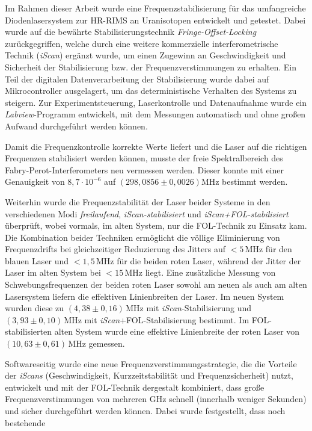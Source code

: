 Im Rahmen dieser Arbeit wurde eine Frequenzstabilisierung für das
umfangreiche Diodenlasersystem zur HR-RIMS an Uranisotopen entwickelt und
getestet. Dabei wurde auf die bewährte Stabilisierungstechnik \textit{Fringe-Offset-Locking} zurückgegriffen, welche
durch eine weitere kommerzielle interferometrische Technik (\textit{iScan})
ergänzt wurde, um einen Zugewinn an Geschwindigkeit und Sicherheit der Stabilisierung bzw. der
Frequenzverstimmungen zu erhalten.
Ein Teil der digitalen Datenverarbeitung der Stabilisierung wurde dabei auf
Mikrocontroller ausgelagert, um das deterministische Verhalten des Systems zu steigern. Zur
Experimentsteuerung, Laserkontrolle und Datenaufnahme wurde ein
\textit{Labview}-Programm entwickelt, mit dem Messungen
automatisch und ohne großen Aufwand durchgeführt werden können.\par
Damit die Frequenzkontrolle korrekte Werte liefert und die Laser auf die
richtigen Frequenzen stabilisiert werden können, musste der freie
Spektralbereich des Fabry-Perot-Interferometers neu vermessen werden. Dieser
konnte mit einer Genauigkeit von $8,7\cdot10^{-6}$ auf $(298,0856\pm0,0026)$MHz
bestimmt werden.\par
Weiterhin wurde die Frequenzstabilität der Laser beider
Systeme in den verschiedenen Modi \textit{freilaufend}, \textit{iScan-stabilisiert} und
\textit{iScan+FOL-stabilisiert} überprüft, wobei vormals, im alten System, nur
die FOL-Technik zu Einsatz kam. Die Kombination beider Techniken ermöglicht die
völlige Eliminierung von Frequenzdrifts bei gleichzeitiger Reduzierung des
Jitters auf $<5\,$MHz für den blauen Laser und $<1,5\,$MHz für die beiden roten
Laser, während der Jitter der Laser im alten System bei 
$<15\,$MHz liegt. Eine zusätzliche Messung von Schwebungsfrequenzen der beiden
roten Laser sowohl am neuen als auch am alten Lasersystem liefern die
effektiven Linienbreiten der Laser. Im neuen System wurden diese zu
$(4,38\pm0,16)\,$MHz mit \textit{iScan}-Stabilisierung und $(3,93\pm0,10)\,$MHz
mit \textit{iScan}+FOL-Stabilisierung bestimmt. Im FOL-stabilisierten alten
System wurde eine effektive Linienbreite der roten Laser von
$(10,63\pm0,61)\,$MHz gemessen.\par
Softwareseitig wurde eine neue Frequenzverstimmungsstrategie, die die
Vorteile der \textit{iScans} (Geschwindigkeit, Kurzzeitstabilität und Frequenzsicherheit)
nutzt, entwickelt und mit der FOL-Technik dergestalt kombiniert, dass große
Frequenzverstimmungen von mehreren GHz schnell (innerhalb weniger Sekunden) und sicher durchgeführt
werden können. Dabei wurde festgestellt, dass noch bestehende
